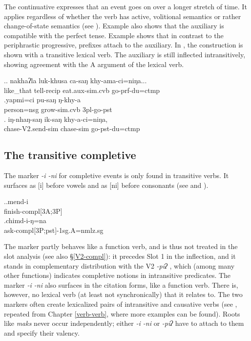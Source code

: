 The continuative expresses that an event goes on over a longer stretch of time. It applies regardless of whether the verb has active, volitional semantics \Next[a] or rather change-of-state semantics (see \Next[b]). Example \Next[a] also shows that the auxiliary is compatible  with the perfect tense. Example \Next[b] shows that in contrast to the periphrastic progressive, prefixes attach to the auxiliary. In \Next[c], the construction is shown with a transitive lexical verb. The auxiliary is still inflected intransitively, showing agreement with the A argument of the lexical verb.  
 	
\ex.\ag. nakhaʔla   luk-khusa    ca-saŋ           khy-ama-ci=niŋa...\\
like\_that tell{\sc -recip} {\sc eat.aux-sim.cvb} go{\sc -prf-du=ctmp}\\
 
\bg.yapmi=ci pu-saŋ ŋ-khy-a\\
person{\sc =nsg} grow{\sc -sim.cvb}  {\sc 3pl-}go{\sc -pst}\\
 
 \bg.      iŋ-nhaŋ-saŋ            ik-saŋ         khy-a-ci=niŋa,\\
 chase{\sc -V2.send-sim} chase{\sc -sim} go{\sc -pst-du=ctmp}\\
  
 
\subsection{The transitive completive}\label{completive}
 
 The marker  \emph{-i \ti -ni} for completive events is only found in transitive verbs. It surfaces as [i] before vowels and as [ni] before consonants (see \Next and \NNext). 
 
 \ex.\ag.mend-i\\
 finish{\sc -compl[3A;3P]}\\
 \bg.chimd-i-ŋ=na\\
ask{\sc -compl[3P;pst]-1sg.A=nmlz.sg}\\
 
The marker partly behaves like a function verb, and is thus not treated in the slot analysis (see also §\ref{V2-compl}): it precedes Slot 1 in the inflection, and it stands in complementary distribution with the V2 \emph{-piʔ} , which (among many other functions) indicates completive notions in intransitive  predicates. The marker \emph{-i \ti -ni} also surfaces in the citation forms, like a function verb. There is, however, no lexical verb (at least not synchronically) that it relates to. The two markers often create lexicalized pairs of intransitive and causative verbs (see \Next, repeated from Chapter \ref{verb-verb}, where more examples can be found). Roots like \emph{maks}  never occur independently; either \emph{-i \ti -ni} or \emph{-piʔ} have to attach to them and specify their valency. 


